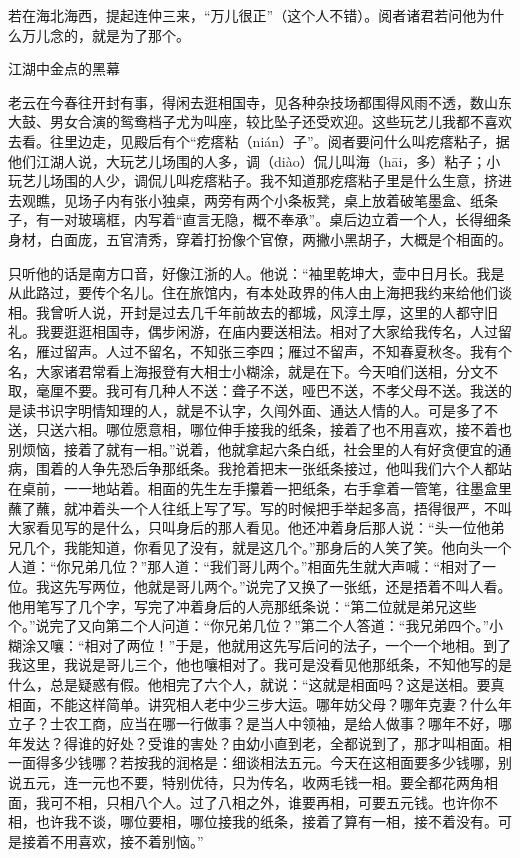 \documentclass[12pt,UTF8]{ctexbook}
\begin{document}
若在海北海西，提起连仲三来，“万儿很正”（这个人不错）。阅者诸君若问他为什么万儿念的，就是为了那个。





江湖中金点的黑幕


老云在今春往开封有事，得闲去逛相国寺，见各种杂技场都围得风雨不透，数山东大鼓、男女合演的鸳鸯档子尤为叫座，较比坠子还受欢迎。这些玩艺儿我都不喜欢去看。往里边走，见殿后有个“疙瘩粘（nián）子”。阅者要问什么叫疙瘩粘子，据他们江湖人说，大玩艺儿场围的人多，调（diào）侃儿叫海（hāi，多）粘子；小玩艺儿场围的人少，调侃儿叫疙瘩粘子。我不知道那疙瘩粘子里是什么生意，挤进去观瞧，见场子内有张小独桌，两旁有两个小条板凳，桌上放着破笔墨盒、纸条子，有一对玻璃框，内写着“直言无隐，概不奉承”。桌后边立着一个人，长得细条身材，白面庞，五官清秀，穿着打扮像个官僚，两撇小黑胡子，大概是个相面的。

只听他的话是南方口音，好像江浙的人。他说：“袖里乾坤大，壶中日月长。我是从此路过，要传个名儿。住在旅馆内，有本处政界的伟人由上海把我约来给他们谈相。我曾听人说，开封是过去几千年前故去的都城，风淳土厚，这里的人都守旧礼。我要逛逛相国寺，偶步闲游，在庙内要送相法。相对了大家给我传名，人过留名，雁过留声。人过不留名，不知张三李四；雁过不留声，不知春夏秋冬。我有个名，大家诸君常看上海报登有大相士小糊涂，就是在下。今天咱们送相，分文不取，毫厘不要。我可有几种人不送：聋子不送，哑巴不送，不孝父母不送。我送的是读书识字明情知理的人，就是不认字，久闯外面、通达人情的人。可是多了不送，只送六相。哪位愿意相，哪位伸手接我的纸条，接着了也不用喜欢，接不着也别烦恼，接着了就有一相。”说着，他就拿起六条白纸，社会里的人有好贪便宜的通病，围着的人争先恐后争那纸条。我抢着把末一张纸条接过，他叫我们六个人都站在桌前，一一地站着。相面的先生左手攥着一把纸条，右手拿着一管笔，往墨盒里蘸了蘸，就冲着头一个人往纸上写了写。写的时候把手举起多高，捂得很严，不叫大家看见写的是什么，只叫身后的那人看见。他还冲着身后那人说：“头一位他弟兄几个，我能知道，你看见了没有，就是这几个。”那身后的人笑了笑。他向头一个人道：“你兄弟几位？”那人道：“我们哥儿两个。”相面先生就大声喊：“相对了一位。我这先写两位，他就是哥儿两个。”说完了又换了一张纸，还是捂着不叫人看。他用笔写了几个字，写完了冲着身后的人亮那纸条说：“第二位就是弟兄这些个。”说完了又向第二个人问道：“你兄弟几位？”第二个人答道：“我兄弟四个。”小糊涂又嚷：“相对了两位！”于是，他就用这先写后问的法子，一个一个地相。到了我这里，我说是哥儿三个，他也嚷相对了。我可是没看见他那纸条，不知他写的是什么，总是疑惑有假。他相完了六个人，就说：“这就是相面吗？这是送相。要真相面，不能这样简单。讲究相人老中少三步大运。哪年妨父母？哪年克妻？什么年立子？士农工商，应当在哪一行做事？是当人中领袖，是给人做事？哪年不好，哪年发达？得谁的好处？受谁的害处？由幼小直到老，全都说到了，那才叫相面。相一面得多少钱哪？若按我的润格是：细谈相法五元。今天在这相面要多少钱哪，别说五元，连一元也不要，特别优待，只为传名，收两毛钱一相。要全都花两角相面，我可不相，只相八个人。过了八相之外，谁要再相，可要五元钱。也许你不相，也许我不谈，哪位要相，哪位接我的纸条，接着了算有一相，接不着没有。可是接着不用喜欢，接不着别恼。”
\end{document}
